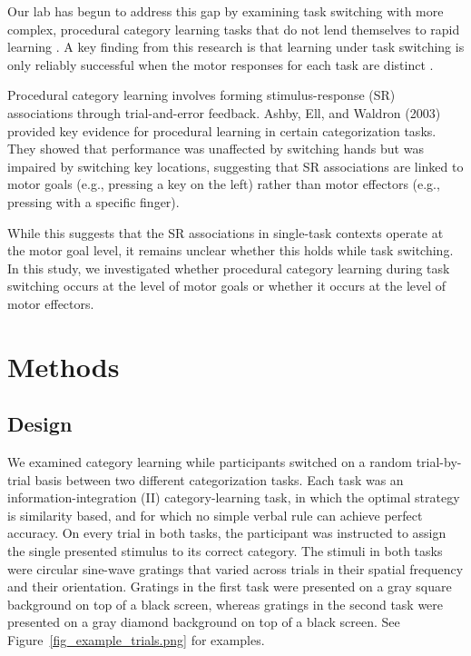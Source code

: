 \documentclass[doc, floatsintext]{apa7}
\begin{document}
Our lab has begun to address this gap by examining task
switching with more complex, procedural category learning
tasks that do not lend themselves to rapid learning
\parencite{crossley_switch_2023,
crossley_trial-by-trial_2018, turner_hierarchical_2017}. A
key finding from this research is that learning under task
switching is only reliably successful when the motor
responses for each task are distinct
\parencite{crossley_switch_2023}. 

Procedural category learning involves forming
stimulus-response (SR) associations through trial-and-error
feedback. Ashby, Ell, and Waldron (2003) provided key
evidence for procedural learning in certain categorization
tasks. They showed that performance was unaffected by
switching hands but was impaired by switching key locations,
suggesting that SR associations are linked to motor goals
(e.g., pressing a key on the left) rather than motor
effectors (e.g., pressing with a specific finger).

While this suggests that the SR associations in single-task
contexts operate at the motor goal level, it remains unclear
whether this holds while task switching. In this study, we
investigated whether procedural category learning during
task switching occurs at the level of motor goals or whether
it occurs at the level of motor effectors.

\section{Methods}

\subsection{Design}
We examined category learning while participants switched on
a random trial-by-trial basis between two different
categorization tasks.   Each task was an
information-integration (II) category-learning task, in
which the optimal strategy is similarity based, and for
which no simple verbal rule
\parencite{ashby_neuropsychological_1998,
ashby_decision_1988} can achieve perfect accuracy.   On
every trial in both tasks, the participant was instructed to
assign the single presented stimulus to its correct
category.  The stimuli in both tasks were circular sine-wave
gratings that varied across trials in their spatial
frequency and their orientation.   Gratings in the first
task were presented on a gray square background on top of a
black screen, whereas gratings in the second task were
presented on a gray diamond background on top of a black
screen. See Figure~\ref{fig_example_trials.png} for
examples.
\end{document}
